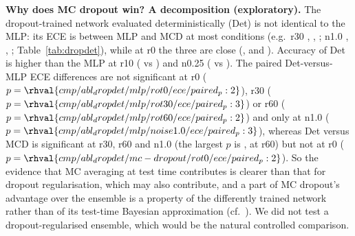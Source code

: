 \textbf{Why does MC dropout win? A decomposition (exploratory).} The dropout-trained network evaluated deterministically (Det) is not identical to the MLP: its ECE is between MLP and MCD at most conditions (e.g.\ r30 , , ; n1.0 , , ; Table~\ref{tab:dropdet}), while at r0 the three are close (,  and ). Accuracy of Det is higher than the MLP at r10 ( vs ) and n0.25 ( vs ). The paired Det-versus-MLP ECE differences are not significant at r0 ($p=\rhval{cmp/abl_dropdet/mlp/rot0/ece/paired_p:2}$), r30 ($p=\rhval{cmp/abl_dropdet/mlp/rot30/ece/paired_p:3}$) or r60 ($p=\rhval{cmp/abl_dropdet/mlp/rot60/ece/paired_p:2}$) and only at n1.0 ($p=\rhval{cmp/abl_dropdet/mlp/noise1.0/ece/paired_p:3}$), whereas Det versus MCD is significant at r30, r60 and n1.0 (the largest $p$ is , at r60) but not at r0 ($p=\rhval{cmp/abl_dropdet/mc-dropout/rot0/ece/paired_p:2}$). So the evidence that MC averaging at test time contributes is clearer than that for dropout regularisation, which may also contribute, and a part of MC dropout's advantage over the ensemble is a property of the differently trained network rather than of its test-time Bayesian approximation (cf.~\cite{folgoc2021is}). We did not test a dropout-regularised ensemble, which would be the natural controlled comparison.

